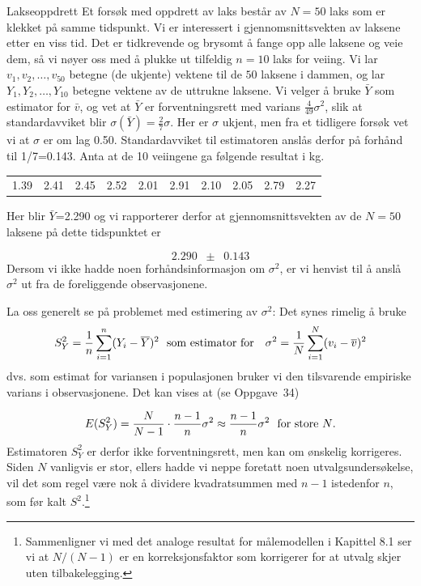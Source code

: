 \begin{eksempel}{Lakseoppdrett}
Et forsøk med oppdrett av laks består av $N=50$ laks som
er klekket på samme tidspunkt. Vi er interessert i
gjennomsnittsvekten av laksene etter en viss tid. Det er
tidkrevende og brysomt å fange opp alle laksene og veie dem,
så vi nøyer oss med å plukke ut tilfeldig $n=10$ laks
for veiing. Vi lar $v_1,v_2,\ldots ,v_{50}$ betegne (de ukjente)
vektene til de $50$ laksene i dammen, og lar
$Y_1,Y_2,\ldots ,Y_{10}$ betegne vektene av de uttrukne laksene. Vi
velger å bruke ${\bar Y}$ som estimator for ${\bar v}$,
og vet at $\bar Y$ er forventningsrett med varians 
$\frac{4}{49}\sigma ^2$, slik at standardavviket blir 
$\sigma(\bar Y)=\frac{2}{7}\sigma$. Her er
$\sigma$ ukjent, men fra et tidligere forsøk vet vi at
$\sigma$ er om lag 0.50. Standardavviket til estimatoren
anslås derfor på forhånd til 1/7=0.143. Anta at de 10
veiingene ga følgende resultat i kg.
\begin{center}
\begin{tabular}{cccccccccc}
     1.39&2.41&2.45&2.52&2.01&2.91&2.10&2.05&2.79&2.27
\end{tabular}
\end{center}
Her blir ${\bar Y}$=2.290 og vi rapporterer derfor at
gjennomsnittsvekten av de $N=50$ laksene på dette tidspunktet
er

\[  2.290 \;\; \pm \;\; 0.143\]
Dersom vi ikke hadde noen forhåndsinformasjon om $\sigma ^2$,
er vi henvist til å anslå $\sigma ^2$ ut fra de
foreliggende observasjonene.
\end{eksempel}

La oss generelt se på problemet med estimering av $\sigma ^2$:
Det synes rimelig å bruke \\
\[     S_Y^2={1\over n}\sum_{i=1}^n (Y_i-\bar{Y})^2
         \mbox{\ \ som estimator for \ \ }
            \sigma ^2={1\over N}\sum_{i=1}^N(v_i-\bar{v})^2 \]
dvs. som estimat for variansen i populasjonen bruker vi den
tilsvarende empiriske varians i observasjonene. Det kan vises at
(se Oppgave~34)

\[  E(S_Y^2)={N\over N-1}\cdot {n-1\over n}{\sigma}^2
            \approx {n-1\over n}\sigma ^2 \mbox{\ \  for store $N$.}  \]
Estimatoren $S_Y^2$ er derfor ikke forventningsrett, men kan om
ønskelig kor\-rigeres. Siden $N$ vanligvis er stor, ellers hadde
vi neppe foretatt noen utvalgsundersøkelse, vil det som regel
være nok å dividere kvadratsummen med $n-1$ istedenfor
$n$, som før kalt $S^2$.\footnote{Sammenligner vi med det
analoge resultat for målemodellen i Kapittel 8.1 ser vi at
$N/(N-1)$ er en korreksjonsfaktor som korrigerer for at utvalg
skjer uten tilbakelegging.}

